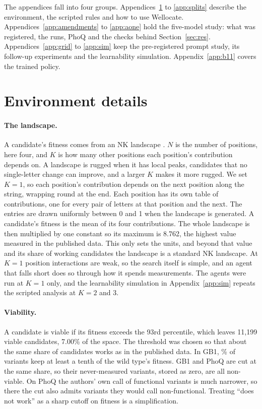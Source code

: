 \providecommand{\estci}[2]{\begin{tabular}[t]{@{}c@{}}#1\\[-1pt]{\scriptsize #2}\end{tabular}}
The appendices fall into four groups. Appendices~\ref{app:env} to \ref{app:splits} describe the environment, the
scripted rules and how to use Wellocate. Appendices~\ref{app:amendments} to \ref{app:aone} hold the five-model study: what was registered, the runs, PhoQ and the checks behind Section~\ref{sec:res}.
Appendices~\ref{app:grid} to \ref{app:sim} keep the pre-registered prompt study, its follow-up experiments and the learnability simulation. Appendix~\ref{app:b11} covers the trained policy.

\section{Environment details}
\label{app:env}

\paragraph{The landscape.} A candidate's fitness comes from an NK landscape \citep{kauffman1989nk}. $N$ is
the number of positions, here four, and $K$ is how many other positions each position's contribution
depends on. A landscape is rugged when it has local peaks, candidates that no single-letter change can
improve, and a larger $K$ makes it more rugged. We set $K=1$, so each position's contribution depends on the
next position along the string, wrapping round at the end. Each position has its own table of
contributions, one for every pair of letters at that position and the next. The entries are drawn uniformly between 0 and 1 when the landscape is generated. A candidate's fitness is the mean of its four contributions. The whole
landscape is then multiplied by one constant so its maximum is 8.762, the highest value measured in the
published data. This only sets the units, and beyond that value and its share of working candidates the
landscape is a standard NK landscape. At $K=1$ position interactions are weak, so the search itself is simple, and an
agent that falls short does so through how it spends measurements. The agents were run at $K=1$ only, and
the learnability simulation in Appendix~\ref{app:sim} repeats the scripted analysis at $K=2$ and 3.

\paragraph{Viability.} A candidate is viable if its fitness exceeds the 93rd percentile, which leaves
11{,}199 viable candidates, 7.00\% of the space. The threshold was chosen so that about the same share of
candidates works as in the published data. In GB1, \nGbViable\% of variants keep at least a tenth of the wild type's
fitness. GB1 and PhoQ are cut at the same share, so their never-measured variants, stored as zero, are all
non-viable. On PhoQ the authors' own call of functional variants is much narrower, so there the cut also admits
variants they would call non-functional. Treating ``does not work'' as a sharp cutoff on fitness is a
simplification.

